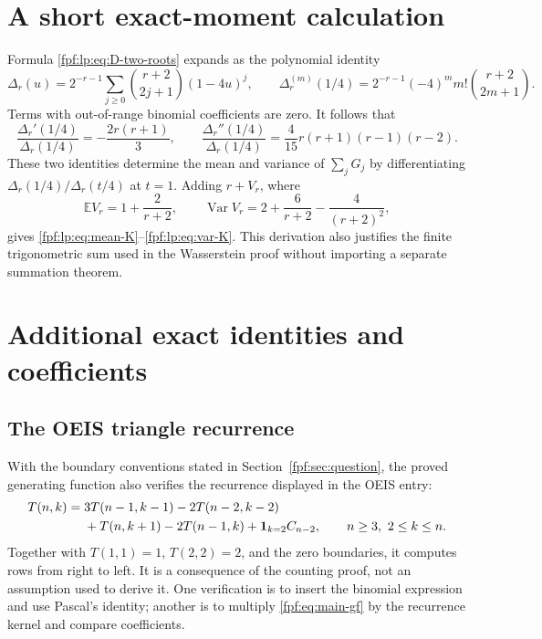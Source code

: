 \documentclass[11pt]{article}
\numberwithin{equation}{section}
\theoremstyle{definition}
\newcommand{\E}{\mathbb E}
\newcommand{\ind}{\mathbf 1}
\newcommand{\Var}{\operatorname{Var}}
\begin{document}
\section{A short exact-moment calculation}
\label{fpf:lp:app:moments}

Formula \eqref{fpf:lp:eq:D-two-roots} expands as the polynomial identity
\begin{equation}\label{fpf:lp:eq:D-derivative}
 \Delta_r(u)=2^{-r-1}\sum_{j\ge0}\binom{r+2}{2j+1}(1-4u)^j,
 \qquad
 \Delta_r^{(m)}(1/4)=2^{-r-1}(-4)^m m!\binom{r+2}{2m+1}.
\end{equation}
Terms with out-of-range binomial coefficients are zero. It follows that
\[
 \frac{\Delta_r'(1/4)}{\Delta_r(1/4)}=-\frac{2r(r+1)}3,
 \qquad
 \frac{\Delta_r''(1/4)}{\Delta_r(1/4)}
 =\frac4{15}r(r+1)(r-1)(r-2).
\]
These two identities determine the mean and variance of
\(\sum_jG_j\) by differentiating
\(\Delta_r(1/4)/\Delta_r(t/4)\) at \(t=1\). Adding \(r+V_r\), where
\[
 \E V_r=1+\frac2{r+2},\qquad
 \Var V_r=2+\frac6{r+2}-\frac4{(r+2)^2},
\]
gives \eqref{fpf:lp:eq:mean-K}--\eqref{fpf:lp:eq:var-K}. This derivation
also justifies the finite trigonometric sum used in the Wasserstein proof
without importing a separate summation theorem.

\appendix
\section{Additional exact identities and coefficients}

\subsection{The OEIS triangle recurrence}
With the boundary conventions stated in Section~\ref{fpf:sec:question}, the proved generating
function also verifies the recurrence displayed in the OEIS entry:
\begin{align}\label{fpf:eq:oeis-rec}
 T(n,k)={}&3T(n-1,k-1)-2T(n-2,k-2)\notag\\
 &+T(n,k+1)-2T(n-1,k)+\ind_{k=2}C_{n-2},
 \qquad n\ge3,\ 2\le k\le n.
\end{align}
Together with $T(1,1)=1$, $T(2,2)=2$, and the zero boundaries, it computes
rows from right to left. It is a consequence of the counting proof, not
an assumption used to derive it. One verification is to insert the
binomial expression and use Pascal's identity; another is to multiply
\eqref{fpf:eq:main-gf} by the recurrence kernel and compare coefficients.
\end{document}
